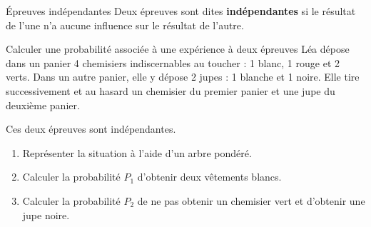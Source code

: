 \begin{defin}{Épreuves indépendantes}
	Deux épreuves sont dites \textbf{indépendantes} si le résultat de l'une
	n'a aucune influence sur le résultat de l'autre.
\end{defin}

\begin{methode}{Calculer une probabilité associée à une expérience à deux épreuves}
	Léa dépose dans un panier 4 chemisiers indiscernables au toucher :
	1 blanc, 1 rouge et 2 verts. Dans un autre panier, elle y dépose
	2 jupes : 1 blanche et 1 noire. Elle tire successivement et au hasard
	un chemisier du premier panier et une jupe du deuxième panier.

	Ces deux épreuves sont indépendantes.

	\begin{enumerate}
		\item Représenter la situation à l'aide d'un arbre pondéré.
		\item Calculer la probabilité $P_1$ d'obtenir deux vêtements blancs.
		\item Calculer la probabilité $P_2$ de ne pas obtenir un chemisier vert
		      et d'obtenir une jupe noire.
	\end{enumerate}
\end{methode}

